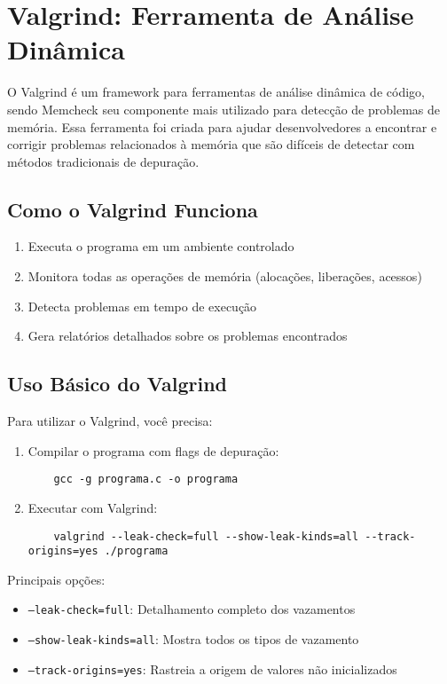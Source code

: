 \documentclass[11pt,a4paper]{article}
\begin{document}
\section{Valgrind: Ferramenta de Análise Dinâmica}

O Valgrind é um framework para ferramentas de análise dinâmica de código, sendo Memcheck seu componente mais utilizado para detecção de problemas de memória. Essa ferramenta foi criada para ajudar desenvolvedores a encontrar e corrigir problemas relacionados à memória que são difíceis de detectar com métodos tradicionais de depuração.

\subsection{Como o Valgrind Funciona}

\begin{enumerate}
    \item Executa o programa em um ambiente controlado
    \item Monitora todas as operações de memória (alocações, liberações, acessos)
    \item Detecta problemas em tempo de execução
    \item Gera relatórios detalhados sobre os problemas encontrados
\end{enumerate}

\subsection{Uso Básico do Valgrind}

Para utilizar o Valgrind, você precisa:

\begin{enumerate}
    \item Compilar o programa com flags de depuração:
    \begin{lstlisting}
    gcc -g programa.c -o programa
    \end{lstlisting}
    
    \item Executar com Valgrind:
    \begin{lstlisting}
    valgrind --leak-check=full --show-leak-kinds=all --track-origins=yes ./programa
    \end{lstlisting}
\end{enumerate}

Principais opções:
\begin{itemize}
    \item \texttt{--leak-check=full}: Detalhamento completo dos vazamentos
    \item \texttt{--show-leak-kinds=all}: Mostra todos os tipos de vazamento
    \item \texttt{--track-origins=yes}: Rastreia a origem de valores não inicializados
\end{itemize}
\end{document}
